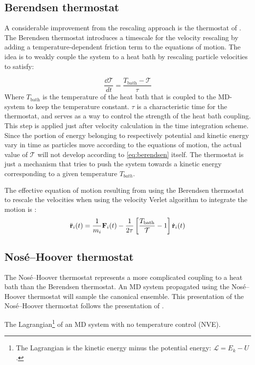 \subsection{Berendsen thermostat}
A considerable improvement from the rescaling approach is the thermostat of \citet{Berendsen1984}. The Berendsen thermostat introduces a timescale for the velocity rescaling by adding a temperature-dependent friction term to the equations of motion. The idea is to weakly couple the system to a heat bath by rescaling particle velocities to satisfy:

\begin{equation}
\frac{\dd \mathcal{T}}{dt} = \frac{T_{\text{bath}}-\mathcal{T}}{\tau}
\label{eq:berendsen}
\end{equation}
Where $T_{\text{bath}}$ is the temperature of the heat bath that is coupled to the MD-system to keep the temperature constant. $\tau$ is a characteristic time for the thermostat, and serves as a way to control the strength of the heat bath coupling. This step is applied just after velocity calculation in the time integration scheme. Since the portion of energy belonging to respectively potential and kinetic energy vary in time as particles move according to the equations of motion, the actual value of $\mathcal{T}$ will not develop according to \ref{eq:berendsen} itself. The thermostat is just a mechanism that tries to push the system towards a kinetic energy corresponding to a given temperature $T_{bath}$.

The effective equation of motion resulting from using the Berendsen thermostat to rescale the velocities when using the velocity Verlet algorithm to integrate the motion is \cite[p.128]{Hunenberger2005}:
\begin{equation}
	\ddot{\mathbf{r}}_i(t) = \frac{1}{m_i} \mathbf{F}_i(t) - \frac{1}{2\tau}\left[ \frac{T_{\text{bath}}}{\mathcal{T}} -1 \right] \dot{\mathbf{r}}_i(t)
\end{equation} 

\subsection{Nosé--Hoover thermostat}
The Nosé--Hoover thermostat represents a more complicated coupling to a heat bath than the Berendsen thermostat. An MD system propagated using the Nosé--Hoover thermostat will sample the canonical ensemble. This presentation of the Nosé--Hoover thermostat follows the presentation of \citet{Hunenberger2005}.


The Lagrangian\footnote{The Lagrangian is the kinetic energy minus the potential energy: $\mathcal{L}=E_k - U$.} of an MD system with no temperature control (NVE).

